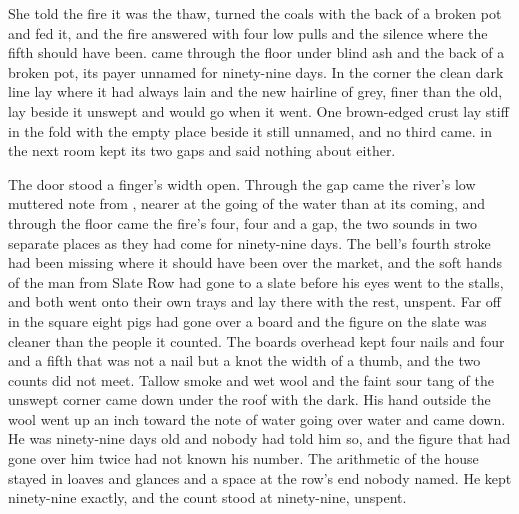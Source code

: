 She told the fire it was the thaw, turned the coals with the back of a broken pot and fed it, and the fire answered with four low pulls and the silence where the fifth should have been.  came through the floor under blind ash and the back of a broken pot, its payer unnamed for ninety-nine days. In the corner the clean dark line lay where it had always lain and the new hairline of grey, finer than the old, lay beside it unswept and would go when it went. One brown-edged crust lay stiff in the fold with the empty place beside it still unnamed, and no third came.  in the next room kept its two gaps and said nothing about either.

The door stood a finger's width open. Through the gap came the river's low muttered note from , nearer at the going of the water than at its coming, and through the floor came the fire's four, four and a gap, the two sounds in two separate places as they had come for ninety-nine days. The bell's fourth stroke had been missing where it should have been over the market, and the soft hands of the man from Slate Row had gone to a slate before his eyes went to the stalls, and both went onto their own trays and lay there with the rest, unspent. Far off in the square eight pigs had gone over a board and the figure on the slate was cleaner than the people it counted. The boards overhead kept four nails and four and a fifth that was not a nail but a knot the width of a thumb, and the two counts did not meet. Tallow smoke and wet wool and the faint sour tang of the unswept corner came down under the roof with the dark. His hand outside the wool went up an inch toward the note of water going over water and came down. He was ninety-nine days old and nobody had told him so, and the figure that had gone over him twice had not known his number. The arithmetic of the house stayed in loaves and glances and a space at the row's end nobody named. He kept ninety-nine exactly, and the count stood at ninety-nine, unspent.
